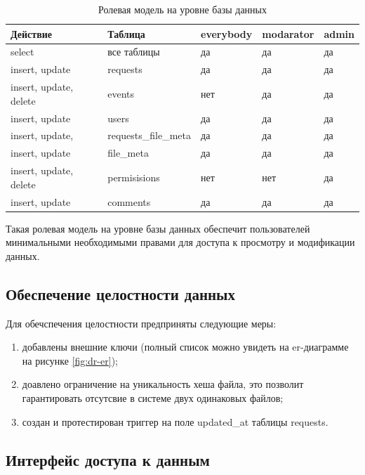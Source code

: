 \begin{table}[ht!]
	\centering
	\caption{\label{tab:roles} Ролевая модель на уровне базы данных}
	\begin{tabular}{|l|l|l|l|l|}
		\hline
		\textbf{Действие} & \textbf{Таблица} & \textbf{everybody} & \textbf{modarator} &  \textbf{admin}\\
		\hline
		select & все таблицы & да & да & да \\
		\hline
		insert, update & requests & да & да & да \\
		\hline
		insert, update, delete & events & нет & да & да \\
		\hline
		insert, update & users & да & да & да \\
		\hline
		insert, update, & requests{\_}file{\_}meta & да & да & да \\
		\hline
		insert, update & file{\_}meta & да & да & да \\
		\hline
		insert, update, delete & permisisions & нет & нет & да \\
		\hline
		insert, update & comments & да & да & да \\
		\hline

	\end{tabular}
\end{table}

Такая ролевая модель на уровне базы данных обеспечит пользователей минимальными необходимыми правами для доступа к просмотру и модификации данных.

\subsection{Обеспечение целостности данных}

Для обечспечения целостности предприняты следующие меры:
\begin{enumerate}
	\item добавлены внешние ключи (полный список можно увидеть на er-диаграмме на рисунке \ref{fig:dr-er});
	\item доавлено ограничение на уникальность хеша файла, это позволит гарантировать отсутсвие в системе двух одинаковых файлов;
	\item создан и протестирован триггер на поле updated{\_}at таблицы requests.
\end{enumerate}


\subsection{Интерфейс доступа к данным}

